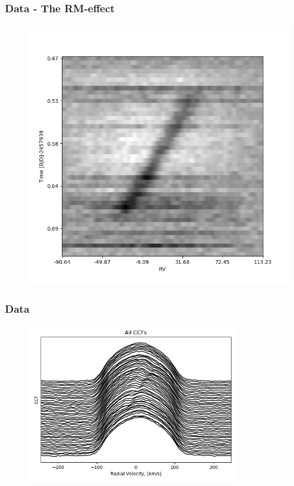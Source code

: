 \documentclass[show notes]{beamer}
\begin{document}
\begin{frame}
\frametitle{Data - The RM-effect}
	\begin{figure}
	\centering
	\includegraphics[width=\textwidth]{../figures/Colormap.png}
	\label{fig:colormap}
\end{figure}
\end{frame}


\begin{frame}
\frametitle{Data}
	\begin{figure}
	\centering
	\includegraphics[width=0.8\textwidth]{../figures/All_CCFs.png}
	\label{fig:all_ccfs}
\end{figure}
\end{frame}
\end{document}
